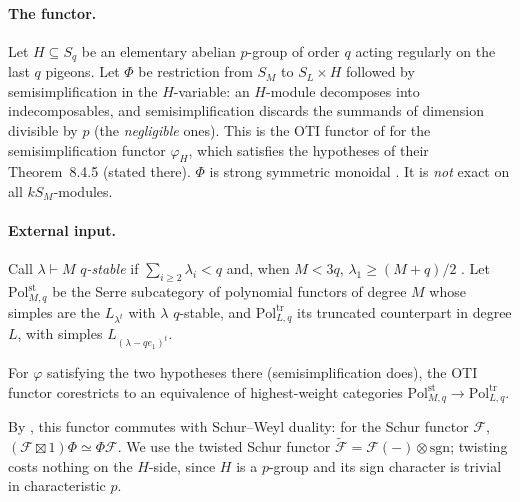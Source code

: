 \paragraph{The functor.}  Let $H\subseteq S_q$ be an elementary abelian $p$-group of order
$q$ acting regularly on the last $q$ pigeons.  Let $\Phi$ be restriction from $S_M$ to
$S_L\times H$ followed by semisimplification in the $H$-variable: an $H$-module
decomposes into indecomposables, and semisimplification discards the summands of dimension
divisible by $p$ (the \emph{negligible} ones).  This is the OTI functor of \cite{hone2025}
for the semisimplification functor $\varphi_H$, which satisfies the hypotheses of their
Theorem~8.4.5 (stated there).  $\Phi$ is strong symmetric monoidal \cite[\S2.4]{hone2025}.  It
is \emph{not} exact on all $kS_M$-modules.

\paragraph{External input.}  Call $\lambda\vdash M$ \emph{$q$-stable} if
$\sum_{i\ge2}\lambda_i<q$ and, when $M<3q$, $\lambda_1\ge(M+q)/2$
\cite[Def.~6.1.1]{hone2025}.  Let $\mathrm{Pol}^{\mathrm{st}}_{M,q}$ be the Serre subcategory
of polynomial functors of degree $M$ whose simples are the $L_{\lambda^t}$ with $\lambda$
$q$-stable, and $\mathrm{Pol}^{\mathrm{tr}}_{L,q}$ its truncated counterpart in degree $L$, with
simples $L_{(\lambda-qe_1)^t}$.

\begin{theorem}\label{thm:hone}
For $\varphi$ satisfying the two hypotheses there (semisimplification does), the OTI
functor corestricts to an equivalence of highest-weight categories
$\mathrm{Pol}^{\mathrm{st}}_{M,q}\to\mathrm{Pol}^{\mathrm{tr}}_{L,q}$.
\end{theorem}

By \cite[Lemma~7.3.2]{hone2025}, this functor commutes with Schur--Weyl duality: for the
Schur functor $\mathcal F$, $(\mathcal F\boxtimes1)\Phi\simeq\Phi\mathcal F$.  We use the
twisted Schur functor $\tilde{\mathcal F}=\mathcal F(-)\otimes\mathrm{sgn}$; twisting costs
nothing on the $H$-side, since $H$ is a $p$-group and its sign character is trivial in
characteristic $p$.

